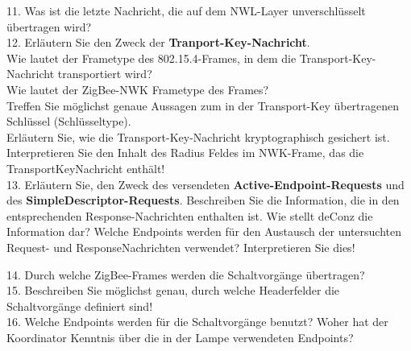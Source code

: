 \begin{Fragen}
    11. Was ist die letzte Nachricht, die auf dem NWL-Layer unverschlüsselt übertragen wird?\\
    
    12. Erläutern Sie den Zweck der \textbf{Tranport-Key-Nachricht}.\\
     Wie lautet der Frametype des 802.15.4-Frames, in dem die Transport-Key-Nachricht transportiert wird? \\
     Wie lautet der ZigBee-NWK Frametype des Frames?\\
     Treffen Sie möglichst genaue Aussagen zum in der Transport-Key übertragenen Schlüssel (Schlüsseltype). \\
     Erläutern Sie, wie die Transport-Key-Nachricht kryptographisch gesichert ist.\\
     Interpretieren Sie den Inhalt des Radius Feldes im NWK-Frame, das die TransportKeyNachricht enthält!\\
    
    13. Erläutern Sie, den Zweck des versendeten \textbf{Active-Endpoint-Requests} und des \textbf{SimpleDescriptor-Requests}.
     Beschreiben Sie die Information, die in den entsprechenden Response-Nachrichten enthalten ist. 
     Wie stellt deConz die Information dar?
     Welche Endpoints werden für den Austausch der untersuchten Request- und ResponseNachrichten verwendet? Interpretieren Sie dies!

    
    14. Durch welche ZigBee-Frames werden die Schaltvorgänge übertragen? \\
    
    15. Beschreiben Sie möglichst genau, durch welche Headerfelder die Schaltvorgänge definiert sind! \\
        
    16. Welche Endpoints werden für die Schaltvorgänge benutzt? Woher hat der Koordinator Kenntnis über die in der Lampe verwendeten Endpoints? \\
    \end{Fragen}

